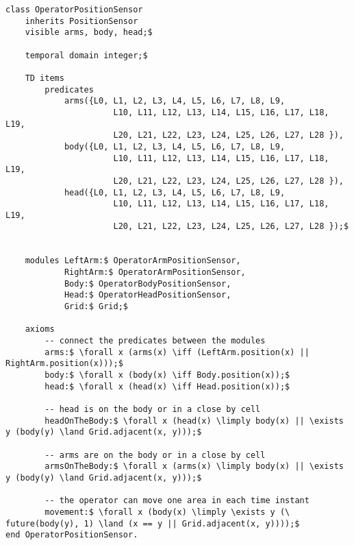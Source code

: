 \begin{lstlisting}[fontadjust, mathescape, frame=tlb] 
class OperatorPositionSensor
    inherits PositionSensor
    visible arms, body, head;$

    temporal domain integer;$

    TD items
        predicates
            arms({L0, L1, L2, L3, L4, L5, L6, L7, L8, L9,
                      L10, L11, L12, L13, L14, L15, L16, L17, L18, L19,
                      L20, L21, L22, L23, L24, L25, L26, L27, L28 }),
            body({L0, L1, L2, L3, L4, L5, L6, L7, L8, L9,
                      L10, L11, L12, L13, L14, L15, L16, L17, L18, L19,
                      L20, L21, L22, L23, L24, L25, L26, L27, L28 }),
            head({L0, L1, L2, L3, L4, L5, L6, L7, L8, L9,
                      L10, L11, L12, L13, L14, L15, L16, L17, L18, L19,
                      L20, L21, L22, L23, L24, L25, L26, L27, L28 });$


    modules LeftArm:$ OperatorArmPositionSensor,
            RightArm:$ OperatorArmPositionSensor,
            Body:$ OperatorBodyPositionSensor,
            Head:$ OperatorHeadPositionSensor,
            Grid:$ Grid;$

    axioms
        -- connect the predicates between the modules
        arms:$ \forall x (arms(x) \iff (LeftArm.position(x) || RightArm.position(x)));$
        body:$ \forall x (body(x) \iff Body.position(x));$
        head:$ \forall x (head(x) \iff Head.position(x));$

        -- head is on the body or in a close by cell
        headOnTheBody:$ \forall x (head(x) \limply body(x) || \exists y (body(y) \land Grid.adjacent(x, y)));$

        -- arms are on the body or in a close by cell
        armsOnTheBody:$ \forall x (arms(x) \limply body(x) || \exists y (body(y) \land Grid.adjacent(x, y)));$

        -- the operator can move one area in each time instant
        movement:$ \forall x (body(x) \limply \exists y (\  future(body(y), 1) \land (x == y || Grid.adjacent(x, y))));$
end OperatorPositionSensor.\end{lstlisting}